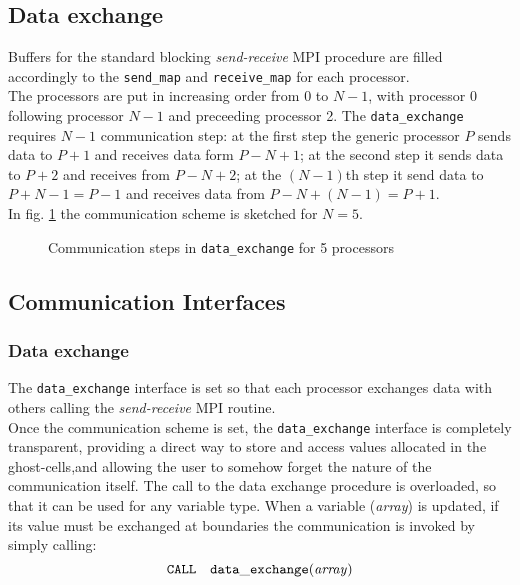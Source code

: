 \subsection{Data exchange}
%
Buffers for the standard blocking {\em send-receive} MPI procedure are filled 
accordingly to the {\tt send\_map} and {\tt receive\_map} for each processor.\\
The processors are put in increasing order from 0 to $N-1$, with processor
0 following processor $N-1$ and preceeding processor 2. 
The {\tt data\_exchange} requires $N-1$ communication step: at the first step the generic 
processor $P$ sends data to $P+1$ and receives data form $P-N+1$;
at the second step it sends data to $P+2$ and receives from $P-N+2$; 
at the $(N-1)$th step it send data to $P+N-1=P-1$ and receives data from $P-N+(N-1)=P+1$.\\ 
In fig. \ref{fig:data-exchange} the communication scheme is sketched for $N=5$.\\
\begin{figure}[h]
\centerline{}
\caption{\label{fig:data-exchange} Communication steps in {\tt data\_exchange} for 5 processors}
\end{figure}
\par
%
\subsection{Communication Interfaces}
%
\subsubsection{Data exchange}
%
The {\tt data\_exchange} interface is set so that each processor exchanges
data with others calling the {\em send-receive} MPI routine.\\ 
Once the communication scheme is set, the {\tt data\_exchange} interface 
is completely transparent, providing a direct way to store and access values 
allocated in the ghost-cells,and allowing the user to somehow forget the 
nature of the communication itself. 
The call to the data exchange procedure is overloaded, so that it can be used
for any variable type.  When a variable ({\em array}) is
 updated, if its value must be exchanged at boundaries the communication is invoked by
simply calling:
\begin{displaymath}
\tt CALL \quad data\_exchange({\it array})
\end{displaymath}
\clearpage%
